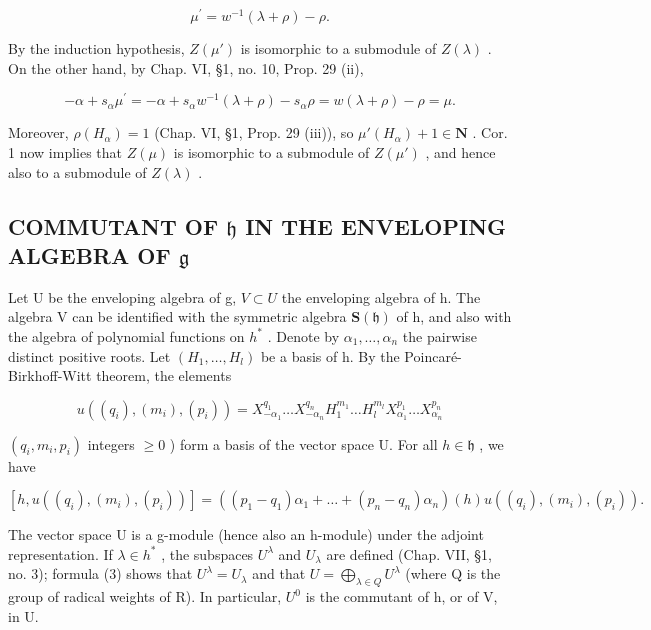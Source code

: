 \[
\mu^ {\prime} = w ^ {- 1} (\lambda + \rho) - \rho .
\]

By the induction hypothesis, \(Z(\mu')\) is isomorphic to a submodule of \(Z(\lambda)\) . On the other hand, by Chap. VI, §1, no. 10, Prop. 29 (ii),

\[
- \alpha + s _ {\alpha} \mu^ {\prime} = - \alpha + s _ {\alpha} w ^ {- 1} (\lambda + \rho) - s _ {\alpha} \rho = w (\lambda + \rho) - \rho = \mu .
\]

Moreover, \(\rho(H_{\alpha}) = 1\) (Chap. VI, §1, Prop. 29 (iii)), so \(\mu'(H_{\alpha}) + 1 \in \mathbf{N}\) . Cor. 1 now implies that \(Z(\mu)\) is isomorphic to a submodule of \(Z(\mu')\) , and hence also to a submodule of \(Z(\lambda)\) .

\subsection{\texorpdfstring{COMMUTANT OF \(\mathfrak{h}\) IN THE ENVELOPING ALGEBRA OF \(\mathfrak{g}\)}{COMMUTANT OF \textbackslash mathfrak\{h\} IN THE ENVELOPING ALGEBRA OF \textbackslash mathfrak\{g\}}}

Let U be the enveloping algebra of g, \(V \subset U\) the enveloping algebra of h. The algebra V can be identified with the symmetric algebra \(\mathbf{S}(\mathfrak{h})\) of h, and also with the algebra of polynomial functions on \(h^{*}\) . Denote by \(\alpha_{1},\ldots,\alpha_{n}\) the pairwise distinct positive roots. Let \((H_{1},\ldots,H_{l})\) be a basis of h. By the Poincaré-Birkhoff-Witt theorem, the elements

\[
u ((q _ {i}), (m _ {i}), (p _ {i})) = X _ {- \alpha_ {1}} ^ {q _ {1}} \dots X _ {- \alpha_ {n}} ^ {q _ {n}} H _ {1} ^ {m _ {1}} \dots H _ {l} ^ {m _ {l}} X _ {\alpha_ {1}} ^ {p _ {1}} \dots X _ {\alpha_ {n}} ^ {p _ {n}}
\]

\((q_{i},m_{i},p_{i})\) integers \(\geq 0\) ) form a basis of the vector space U. For all \(h\in \mathfrak{h}\) , we have

\[
[ h, u ((q _ {i}), (m _ {i}), (p _ {i})) ] = ((p _ {1} - q _ {1}) \alpha_ {1} + \dots + (p _ {n} - q _ {n}) \alpha_ {n}) (h) u ((q _ {i}), (m _ {i}), (p _ {i})).\tag{3}
\]

The vector space U is a g-module (hence also an h-module) under the adjoint representation. If \(\lambda \in h^{*}\) , the subspaces \(U^{\lambda}\) and \(U_{\lambda}\) are defined (Chap. VII, §1, no. 3); formula (3) shows that \(U^{\lambda} = U_{\lambda}\) and that \(U = \bigoplus_{\lambda \in Q} U^{\lambda}\) (where Q is the group of radical weights of R). In particular, \(U^{0}\) is the commutant of h, or of V, in U.

